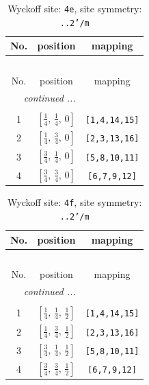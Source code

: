 \documentclass[fleqn,8pt]{jsarticle}
\begin{document}
\begin{longtable}{ccc}
\caption{Wyckoff site: {\tt 4e}, site symmetry: {\tt ..2'/m}}
 \\
 \hline \hline
No. & position & mapping \\ \hline \endfirsthead

\multicolumn{2}{l}{\tablename\ \thetable{}} \\
 \hline \hline
No. & position & mapping \\ \hline \endhead

 \hline \hline
\multicolumn{2}{r}{\footnotesize\it continued ...} \\ \endfoot

 \hline \hline
\multicolumn{2}{r}{} \\ \endlastfoot

1 & $\left[ \frac{1}{4},\, \frac{1}{4},\, 0 \right]$ & {\tt [1,4,14,15]} \\ \hline
2 & $\left[ \frac{1}{4},\, \frac{3}{4},\, 0 \right]$ & {\tt [2,3,13,16]} \\ \hline
3 & $\left[ \frac{3}{4},\, \frac{1}{4},\, 0 \right]$ & {\tt [5,8,10,11]} \\ \hline
4 & $\left[ \frac{3}{4},\, \frac{3}{4},\, 0 \right]$ & {\tt [6,7,9,12]} \\
\end{longtable}
\renewcommand{\arraystretch}{1.2}
\begin{longtable}{ccc}
\caption{Wyckoff site: {\tt 4f}, site symmetry: {\tt ..2'/m}}
 \\
 \hline \hline
No. & position & mapping \\ \hline \endfirsthead

\multicolumn{2}{l}{\tablename\ \thetable{}} \\
 \hline \hline
No. & position & mapping \\ \hline \endhead

 \hline \hline
\multicolumn{2}{r}{\footnotesize\it continued ...} \\ \endfoot

 \hline \hline
\multicolumn{2}{r}{} \\ \endlastfoot

1 & $\left[ \frac{1}{4},\, \frac{1}{4},\, \frac{1}{2} \right]$ & {\tt [1,4,14,15]} \\ \hline
2 & $\left[ \frac{1}{4},\, \frac{3}{4},\, \frac{1}{2} \right]$ & {\tt [2,3,13,16]} \\ \hline
3 & $\left[ \frac{3}{4},\, \frac{1}{4},\, \frac{1}{2} \right]$ & {\tt [5,8,10,11]} \\ \hline
4 & $\left[ \frac{3}{4},\, \frac{3}{4},\, \frac{1}{2} \right]$ & {\tt [6,7,9,12]} \\
\end{longtable}
\end{document}
